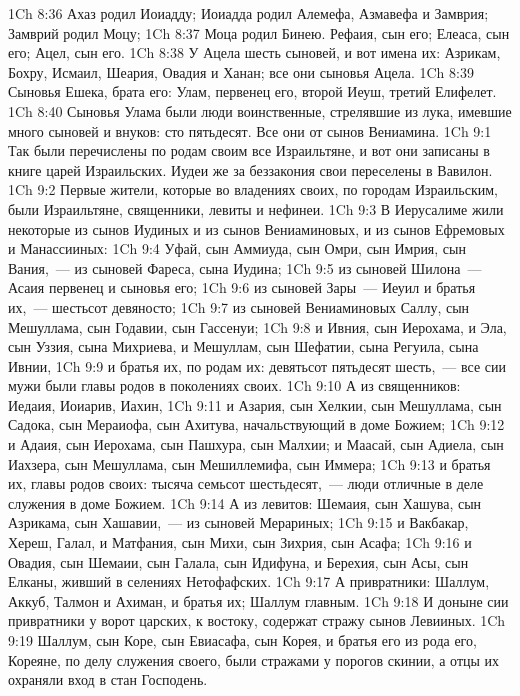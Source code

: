 \vs 1Ch 8:36 Ахаз родил Иоиадду; Иоиадда родил Алемефа, Азмавефа и Замврия; Замврий родил Моцу;
\vs 1Ch 8:37 Моца родил Бинею. Рефаия, сын его; Елеаса, сын его; Ацел, сын его.
\vs 1Ch 8:38 У Ацела шесть сыновей, и вот имена их: Азрикам, Бохру, Исмаил, Шеария, Овадия и Ханан; все они сыновья Ацела.
\vs 1Ch 8:39 Сыновья Ешека, брата его: Улам, первенец его, второй Иеуш, третий Елифелет.
\vs 1Ch 8:40 Сыновья Улама были люди воинственные, стрелявшие из лука, имевшие много сыновей и внуков: сто пятьдесят. Все они от сынов Вениамина.
\vs 1Ch 9:1 Так были перечислены по родам своим все Израильтяне, и вот они записаны в книге царей Израильских. Иудеи же за беззакония свои переселены в Вавилон.
\rsbpar\vs 1Ch 9:2 Первые жители, которые  во владениях своих, по городам Израильским, были Израильтяне, священники, левиты и нефинеи.
\vs 1Ch 9:3 В Иерусалиме жили некоторые из сынов Иудиных и из сынов Вениаминовых, и из сынов Ефремовых и Манассииных:
\vs 1Ch 9:4 Уфай, сын Аммиуда, сын Омри, сын Имрия, сын Вания,~--- из сыновей Фареса, сына Иудина;
\vs 1Ch 9:5 из сыновей Шилона~--- Асаия первенец и сыновья его;
\vs 1Ch 9:6 из сыновей Зары~--- Иеуил и братья их,~--- шестьсот девяносто;
\vs 1Ch 9:7 из сыновей Вениаминовых Саллу, сын Мешуллама, сын Годавии, сын Гассенуи;
\vs 1Ch 9:8 и Ивния, сын Иерохама, и Эла, сын Уззия, сына Михриева, и Мешуллам, сын Шефатии, сына Регуила, сына Ивнии,
\vs 1Ch 9:9 и братья их, по родам их: девятьсот пятьдесят шесть,~--- все сии мужи были главы родов в поколениях своих.
\rsbpar\vs 1Ch 9:10 А из священников: Иедаия, Иоиарив, Иахин,
\vs 1Ch 9:11 и Азария, сын Хелкии, сын Мешуллама, сын Садока, сын Мераиофа, сын Ахитува, начальствующий в доме Божием;
\vs 1Ch 9:12 и Адаия, сын Иерохама, сын Пашхура, сын Малхии; и Маасай, сын Адиела, сын Иахзера, сын Мешуллама, сын Мешиллемифа, сын Иммера;
\vs 1Ch 9:13 и братья их, главы родов своих: тысяча семьсот шестьдесят,~--- люди отличные в деле служения в доме Божием.
\rsbpar\vs 1Ch 9:14 А из левитов: Шемаия, сын Хашува, сын Азрикама, сын Хашавии,~--- из сыновей Мерариных;
\vs 1Ch 9:15 и Вакбакар, Хереш, Галал, и Матфания, сын Михи, сын Зихрия, сын Асафа;
\vs 1Ch 9:16 и Овадия, сын Шемаии, сын Галала, сын Идифуна, и Берехия, сын Асы, сын Елканы, живший в селениях Нетофафских.
\rsbpar\vs 1Ch 9:17 А привратники: Шаллум, Аккуб, Талмон и Ахиман, и братья их; Шаллум  главным.
\vs 1Ch 9:18 И доныне сии привратники у ворот царских, к востоку, содержат стражу сынов Левииных.
\vs 1Ch 9:19 Шаллум, сын Коре, сын Евиасафа, сын Корея, и братья его из рода его, Кореяне, по делу служения своего, были стражами у порогов скинии, а отцы их охраняли вход в стан Господень.
